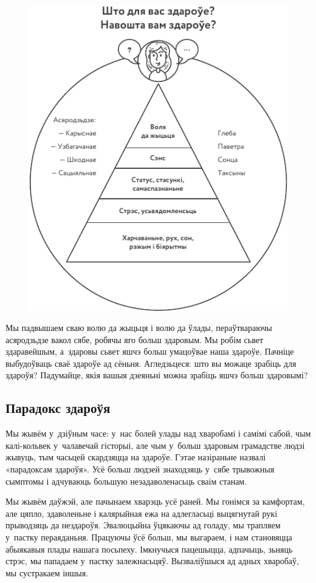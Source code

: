 \begin{figure}[htb!]
  \centering
  \includegraphics[scale=1.5]{willpower/ch1/2.pdf}
\end{figure}

Мы падвышаем сваю волю да жыцьця і волю да ўлады, пераўтвараючы асяродзьдзе вакол сябе, робячы яго больш здаровым. Мы робім сьвет здаравейшым, а~здаровы сьвет яшчэ больш умацоўвае наша здароўе. Пачніце выбудоўваць сваё здароўе ад сёньня. Агледзьцеся: што вы можаце зрабіць для здароўя? Падумайце, якія вашыя дзеяньні можна зрабіць яшчэ больш здаровымі?

\subsection*{Парадокс здароўя}

Мы жывём у~дзіўным часе: у~нас болей улады над хваробамі і самімі сабой, чым калі-кольвек у~чалавечай гісторыі, але чым у~больш здаровым грамадстве людзі жывуць, тым часьцей скардзяцца на здароўе. Гэтае назіраньне назвалі «парадоксам здароўя». Усё больш людзей знаходзяць у~сябе трывожныя сымптомы і адчуваюць большую незадаволенасьць сваім станам.

Мы жывём даўжэй, але пачынаем хварэць усё раней. Мы гонімся за камфортам, але цяпло, здаволеньне і калярыйная ежа на адлегласьці выцягнутай рукі прыводзяць да нездароўя. Эвалюцыйна ўцякаючы ад голаду, мы трапляем у~пастку пераяданьня. Працуючы ўсё больш, мы выгараем, і нам становяцца абыякавыя плады нашага посьпеху. Імкнучыся пацешыцца, адпачыць, зьняць стрэс, мы пападаем у~пастку залежнасьцяў. Вызваліўшыся ад адных хваробаў, мы сустракаем іншыя.

